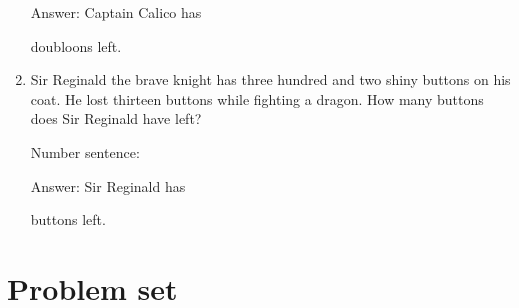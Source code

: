 \documentclass{tufte-book}
\begin{document}
\begin{enumerate}
  Answer: Captain Calico has
  \dotfill\medskip\par\mbox{}\dotfill\medskip\par\mbox{}\dotfill\bigskip
  doubloons left.
\item
  Sir Reginald the brave knight has three hundred and two shiny buttons
  on his coat. He lost thirteen buttons while fighting a dragon. How
  many buttons does Sir Reginald have left?\medskip\par
  Number sentence:
  \dotfill\medskip\par
  Answer: Sir Reginald has
  \dotfill\medskip\par\mbox{}\dotfill\medskip\par\mbox{}\dotfill\bigskip
  buttons left.
\end{enumerate}



\clearpage\section{Problem set }
\end{document}
